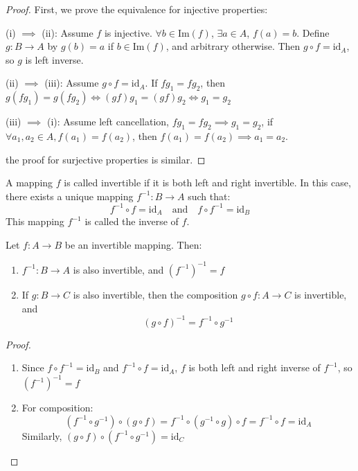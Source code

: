\documentclass[11pt,lang=en]{elegantbook}
\begin{document}
\begin{proof}
  First, we prove the equivalence for injective properties:

  (i) $\implies$ (ii): Assume $f$ is injective.
  $\forall b \in \text{Im}(f)$, $\exists a \in A$, $f(a) = b$.
  Define $g: B \to A$ by $g(b) = a$ if $b \in \text{Im}(f)$, and arbitrary otherwise.
  Then $g \circ f = \text{id}_A$, so $g$ is left inverse.

  (ii) $\implies$ (iii): Assume $g \circ f = \text{id}_A$. If $fg_1 = fg_2$, then $g(fg_1)=g(fg_2) \iff (gf)g_1=(gf)g_2 \iff g_1=g_2$

  (iii) $\implies$ (i): Assume left cancellation, $fg_1=fg_2\implies g_1=g_2$,
  if $\forall a_1,a_2\in A,f(a_1)=f(a_2)$, then $f(a_1)=f(a_2)\implies a_1=a_2$.

  the proof for surjective properties is similar.
\end{proof}

\begin{definition}
  A mapping $f$ is called invertible if it is both left and right invertible. In this case, there exists a unique mapping $f^{-1}: B \to A$ such that:
  \[
    f^{-1} \circ f = \text{id}_A \quad \text{and} \quad f \circ f^{-1} = \text{id}_B
  \]
  This mapping $f^{-1}$ is called the inverse of $f$.
\end{definition}

\begin{proposition}
  Let $f : A \to B$ be an invertible mapping. Then:
  \begin{enumerate}
    \item $f^{-1} : B \to A$ is also invertible, and $(f^{-1})^{-1} = f$
    \item If $g : B \to C$ is also invertible, then the composition $g \circ f : A \to C$ is invertible, and
      \[
        (g \circ f)^{-1} = f^{-1} \circ g^{-1}
      \]
  \end{enumerate}
\end{proposition}

\begin{proof}
  \begin{enumerate}
    \item Since $f \circ f^{-1} = \text{id}_B$ and $f^{-1} \circ f = \text{id}_A$,
      $f$ is both left and right inverse of $f^{-1}$, so $(f^{-1})^{-1} = f$

    \item For composition:
      \[
        (f^{-1} \circ g^{-1}) \circ (g \circ f) = f^{-1} \circ (g^{-1} \circ g) \circ f = f^{-1} \circ f = \text{id}_A
      \]
      Similarly, $(g \circ f) \circ (f^{-1} \circ g^{-1}) = \text{id}_C$
  \end{enumerate}
\end{proof}
\end{document}
